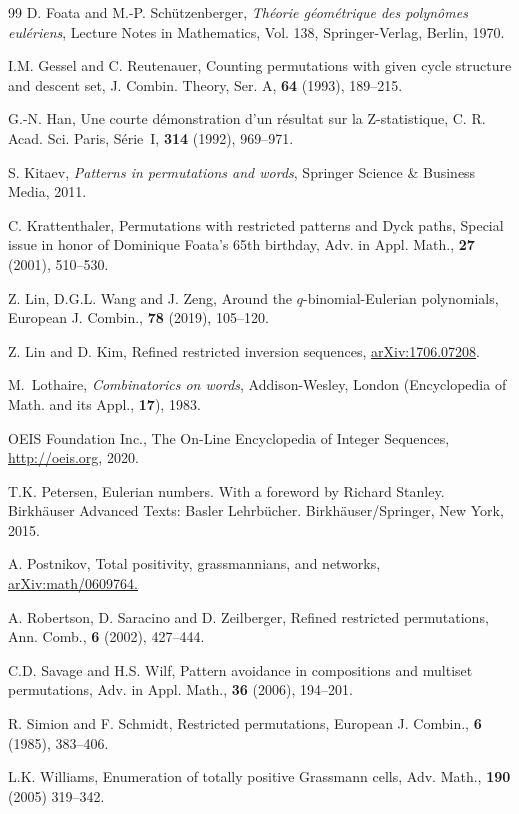 \documentclass[12pt]{amsart} %
\numberwithin{equation}{section}
\theoremstyle{plain}
\theoremstyle{definition}
\begin{document}
\begin{thebibliography}{99}
 D. Foata and M.-P. Sch\"utzenberger, {\em Th\'eorie g\'eom\'etrique des polyn\^omes eul\'eriens}, Lecture Notes in Mathematics, Vol. 138, Springer-Verlag, Berlin, 1970.

 I.M. Gessel and C. Reutenauer, Counting permutations with given cycle structure and descent set, J. Combin. Theory, Ser. A, {\bf64} (1993), 189--215.


 G.-N. Han, Une courte d\'emonstration d'un r\'esultat sur la Z-statistique, C. R. Acad. Sci. Paris, S\'erie~I,  {\bf 314} (1992),  969--971.


 S. Kitaev, {\em Patterns in permutations and words}, Springer Science \& Business Media, 2011. 

C. Krattenthaler, Permutations with restricted patterns and Dyck paths, 
Special issue in honor of Dominique Foata's 65th birthday, 
Adv. in Appl. Math., {\bf27} (2001), 510--530.

Z. Lin, D.G.L. Wang and J. Zeng,  Around the $q$-binomial-Eulerian polynomials, European J. Combin., {\bf78} (2019), 105--120. 

  Z. Lin and D. Kim, Refined restricted inversion sequences, \href{https://arxiv.org/abs/1706.07208}{arXiv:1706.07208}. 

M.~Lothaire, {\em Combinatorics on words}, Addison-Wesley, London (Encyclopedia of Math. and its Appl., {\bf 17}), 1983.

 
 OEIS Foundation Inc., The On-Line Encyclopedia of Integer Sequences,  \href{http://oeis.org}{http://oeis.org}, 2020.

 T.K. Petersen, Eulerian numbers. With a foreword by Richard Stanley. Birkh\"auser Advanced Texts: Basler Lehrb\"ucher. Birkh\"auser/Springer, New York, 2015.
 
  A. Postnikov, Total positivity, grassmannians, and networks, \href{https://arxiv.org/abs/math/0609764}{arXiv:math/0609764.} 
 
\goodbreak

 A. Robertson, D. Saracino and D. Zeilberger, Refined restricted permutations, Ann. Comb., {\bf6} (2002), 427--444.
	

 C.D. Savage and H.S. Wilf, Pattern avoidance in compositions and multiset permutations, Adv. in Appl. Math., {\bf36} (2006), 194--201.

 R. Simion and F. Schmidt,  Restricted permutations, European J. Combin.,  {\bf6} (1985), 383--406.

 L.K. Williams, Enumeration of totally positive Grassmann cells, Adv. Math., {\bf190} (2005) 319--342.


\end{thebibliography}
%
\end{document}
